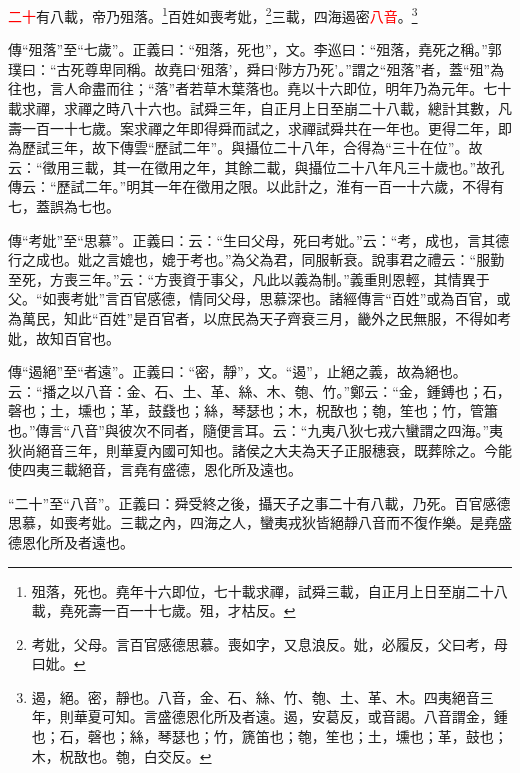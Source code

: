 \textcolor{red}{二十}有八載，帝乃殂落。\footnote{殂落，死也。堯年十六即位，七十載求禪，試舜三載，自正月上日至崩二十八載，堯死壽一百一十七歲。殂，才枯反。}百姓如喪考妣，\footnote{考妣，父母。言百官感德思慕。喪如字，又息浪反。妣，必履反，父曰考，母曰妣。}三載，四海遏密\textcolor{red}{八音}。\footnote{遏，絕。密，靜也。八音，金、石、絲、竹、匏、土、革、木。四夷絕音三年，則華夏可知。言盛德恩化所及者遠。遏，安葛反，或音謁。八音謂金，鍾也；石，磬也；絲，琴瑟也；竹，篪笛也；匏，笙也；土，壎也；革，鼓也；木，柷敔也。匏，白交反。}

{\noindent\zhuan{}\fzbyks 傳“殂落”至“七歲”。正義曰：“殂落，死也”，文。李巡曰：“殂落，堯死之稱。”郭璞曰：“古死尊卑同稱。故堯曰‘殂落’，舜曰‘陟方乃死’。”謂之“殂落”者，蓋“殂”為往也，言人命盡而往；“落”者若草木葉落也。堯以十六即位，明年乃為元年。七十載求禪，求禪之時八十六也。試舜三年，自正月上日至崩二十八載，總計其數，凡壽一百一十七歲。案求禪之年即得舜而試之，求禪試舜共在一年也。更得二年，即為歷試三年，故下傳雲“歷試二年”。與攝位二十八年，合得為“三十在位”。故云：“徵用三載，其一在徵用之年，其餘二載，與攝位二十八年凡三十歲也。”故孔傳云：“歷試二年。”明其一年在徵用之限。以此計之，淮有一百一十六歲，不得有七，蓋誤為七也。 \par}

{\noindent\zhuan{}\fzbyks 傳“考妣”至“思慕”。正義曰：云：“生曰父母，死曰考妣。”云：“考，成也，言其德行之成也。妣之言媲也，媲于考也。”為父為君，同服斬衰。說事君之禮云：“服勤至死，方喪三年。”云：“方喪資于事父，凡此以義為制。”義重則恩輕，其情異于父。“如喪考妣”言百官感德，情同父母，思慕深也。諸經傳言“百姓”或為百官，或為萬民，知此“百姓”是百官者，以庶民為天子齊衰三月，畿外之民無服，不得如考妣，故知百官也。 \par}

{\noindent\zhuan{}\fzbyks 傳“遏絕”至“者遠”。正義曰：“密，靜”，文。“遏”，止絕之義，故為絕也。云：“播之以八音：金、石、土、革、絲、木、匏、竹。”鄭云：“金，鍾鎛也；石，磬也；土，壎也；革，鼓鼗也；絲，琴瑟也；木，柷敔也；匏，笙也；竹，管簫也。”傳言“八音”與彼次不同者，隨便言耳。云：“九夷八狄七戎六蠻謂之四海。”夷狄尚絕音三年，則華夏內國可知也。諸侯之大夫為天子正服穗衰，既葬除之。今能使四夷三載絕音，言堯有盛德，恩化所及遠也。 \par}

{\noindent\shu{}\fzkt “二十”至“八音”。正義曰：舜受終之後，攝天子之事二十有八載，乃死。百官感德思慕，如喪考妣。三載之內，四海之人，蠻夷戎狄皆絕靜八音而不復作樂。是堯盛德恩化所及者遠也。 \par}

